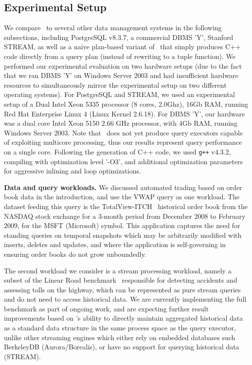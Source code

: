 \subsection{Experimental Setup}
We compare \compiler\ to several other data management systems in the following
subsections, including PostgreSQL v8.3.7, a commercial DBMS 'Y', Stanford STREAM,
as well as a naive plan-based variant of \compiler\ that simply produces C++ code
directly from a query plan (instead of rewriting to a tuple function). We
performed our experimental evaluation on two hardware setups (due to the fact
that we ran DBMS 'Y' on Windows Server 2003 and had insufficient hardware
resources to simultaneously mirror the experimental setup on two different
operating systems). For PostgreSQL and STREAM, we used an experimental setup of a
Dual Intel Xeon 5335 processor (8 cores, 2.0Ghz), 16Gb RAM, running Red Hat
Enterprise Linux 4 (Linux Kernel 2.6.18). For DBMS 'Y', our hardware was a dual
core Intel Xeon 5150 2.66 GHz processor, with 4Gb RAM, running Windows Server
2003. Note that \compiler\ does not yet produce query executors capable of
exploiting multicore processing, thus our results represent query performance on
a single core. Following the generation of C++ code, we used \texttt{g++} v4.3.2,
compiling with optimization level '-O3', and additional optimization parameters
for aggressive inlining and loop optimizations.

\textbf{Data and query workloads.}
We discussed automated trading based on order book data in the introduction, and
use the VWAP query as one workload. The dataset feeding this query is the
TotalView-ITCH~\cite{totalview-url} historical order book from the NASDAQ stock
exchange for a 3-month period from December 2008 to February 2009, for the MSFT
(Microsoft) symbol. This application captures the need for standing queries on
temporal snapshots which may be arbitrarily modified with inserts, deletes and
updates, and where the application is self-governing in ensuring order books do
not grow unboundedly.

The second workload we consider is a stream processing workload, namely a subset
of the Linear Road benchmark~\cite{arasu-vldb:04} responsible for detecting
accidents and assessing tolls on the highway, which can be represented as pure
stream queries and do not need to access historical data. We are currently
implementing the full benchmark as part of ongoing work, and are expecting
further result improvements based on \compiler's ability to directly maintain
aggregated historical data as a standard data structure in the same process space
as the query executor, unlike other streaming engines which either rely on
embedded databases such BerkeleyDB (Aurora/Borealis), or have no support for
querying historical data (STREAM).


